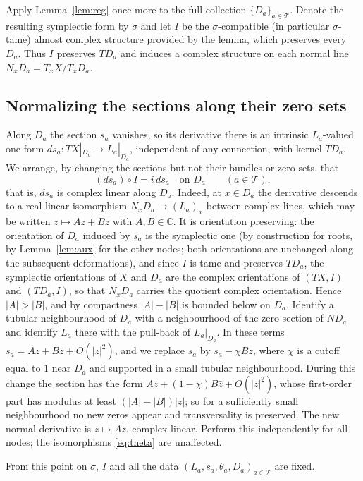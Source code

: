 \documentclass[11pt]{article}
\theoremstyle{remark}
\newcommand{\C}{\mathbb C}
\newcommand{\cT}{\mathcal T}
\begin{document}
Apply Lemma~\ref{lem:reg} once more to the full collection
$\{D_a\}_{a\in\cT}$. Denote the resulting symplectic form by $\sigma$
and let $I$ be the $\sigma$-compatible (in particular $\sigma$-tame)
almost complex structure provided by the lemma, which preserves every
$D_a$. Thus $I$ preserves $TD_a$ and induces a complex structure on
each normal line $N_xD_a=T_xX/T_xD_a$.

\subsection*{Normalizing the sections along their zero sets}
Along $D_a$ the section $s_a$ vanishes, so its derivative there is an
intrinsic $L_a$-valued one-form $ds_a\colon TX|_{D_a}\to L_a|_{D_a}$,
independent of any connection, with kernel $TD_a$. We arrange, by
changing the sections but not their bundles or zero sets, that
\begin{equation}\label{eq:normal-linear}
 (ds_a)\circ I=i\,ds_a\quad\text{on }D_a\qquad(a\in\cT),
\end{equation}
that is, $ds_a$ is complex linear along $D_a$. Indeed, at $x\in D_a$
the derivative descends to a real-linear isomorphism
$N_xD_a\to(L_a)_x$ between complex lines, which may be written
$z\mapsto Az+B\bar z$ with $A,B\in\C$. It is orientation preserving:
the orientation of $D_a$ induced by $s_a$ is the symplectic one (by
construction for roots, by Lemma~\ref{lem:aux} for the other nodes;
both orientations are unchanged along the subsequent deformations),
and since $I$ is tame and preserves $TD_a$, the symplectic orientations
of $X$ and $D_a$ are the complex orientations of $(TX,I)$ and
$(TD_a,I)$, so that $N_xD_a$ carries the quotient complex orientation.
Hence $|A|>|B|$, and by compactness $|A|-|B|$ is bounded below on $D_a$. Identify a tubular neighbourhood of $D_a$ with a
neighbourhood of the zero section of $ND_a$ and identify $L_a$ there
with the pull-back of $L_a|_{D_a}$. In these terms $s_a=Az+B\bar z+O(|z|^2)$,
and we replace $s_a$ by $s_a-\chi B\bar z$, where $\chi$ is a cutoff
equal to $1$ near $D_a$ and supported in a small tubular neighbourhood.
During this change the section has the form
$Az+(1-\chi)B\bar z+O(|z|^2)$, whose first-order part has modulus at
least $(|A|-|B|)|z|$; so for a sufficiently small neighbourhood no new
zeros appear and transversality is preserved. The new normal derivative is $z\mapsto Az$, complex
linear. Perform this independently for all nodes; the isomorphisms
\eqref{eq:theta} are unaffected.

From this point on $\sigma$, $I$ and all the data
$(L_a,s_a,\theta_a,D_a)_{a\in\cT}$ are fixed.
\end{document}
